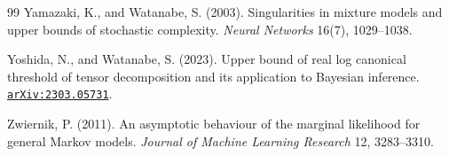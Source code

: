 \documentclass[11pt]{amsart}
\newcommand{\arxiv}[1]{\href{https://arxiv.org/abs/#1}{\texttt{arXiv:#1}}}
\theoremstyle{plain}
\theoremstyle{definition}
\begin{document}
\begin{thebibliography}{99}
Yamazaki, K., and Watanabe, S. (2003). Singularities in mixture models and upper bounds of stochastic complexity. \emph{Neural Networks} 16(7), 1029--1038.

Yoshida, N., and Watanabe, S. (2023). Upper bound of real log canonical threshold of tensor decomposition and its application to Bayesian inference. \arxiv{2303.05731}.

Zwiernik, P. (2011). An asymptotic behaviour of the marginal likelihood for general Markov models. \emph{Journal of Machine Learning Research} 12, 3283--3310.

\end{thebibliography}
\end{document}
